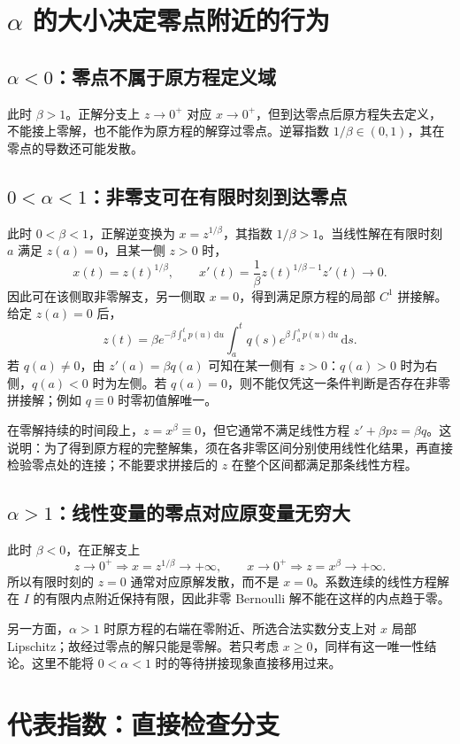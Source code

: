 \documentclass[11pt,a4paper]{ctexart}
\newcommand{\dd}{\,\mathrm d}
\begin{document}
\section{$\alpha$ 的大小决定零点附近的行为}
\subsection{$\alpha<0$：零点不属于原方程定义域}
此时 $\beta>1$。正解分支上 $z\to0^+$ 对应 $x\to0^+$，但到达零点后原方程失去定义，不能接上零解，也不能作为原方程的解穿过零点。逆幂指数 $1/\beta\in(0,1)$，其在零点的导数还可能发散。

\subsection{$0<\alpha<1$：非零支可在有限时刻到达零点}
此时 $0<\beta<1$，正解逆变换为 $x=z^{1/\beta}$，其指数 $1/\beta>1$。当线性解在有限时刻 $a$ 满足 $z(a)=0$，且某一侧 $z>0$ 时，
\[
x(t)=z(t)^{1/\beta},\qquad
x'(t)=\frac1\beta z(t)^{1/\beta-1}z'(t)\longrightarrow0.
\]
因此可在该侧取非零解支，另一侧取 $x=0$，得到满足原方程的局部 $C^1$ 拼接解。给定 $z(a)=0$ 后，
\[
z(t)=\beta e^{-\beta\int_a^t p(u)\dd u}
\int_a^t q(s)e^{\beta\int_a^s p(u)\dd u}\dd s.
\]
若 $q(a)\ne0$，由 $z'(a)=\beta q(a)$ 可知在某一侧有 $z>0$：$q(a)>0$ 时为右侧，$q(a)<0$ 时为左侧。若 $q(a)=0$，则不能仅凭这一条件判断是否存在非零拼接解；例如 $q\equiv0$ 时零初值解唯一。

在零解持续的时间段上，$z=x^\beta\equiv0$，但它通常不满足线性方程 $z'+\beta pz=\beta q$。这说明：为了得到原方程的完整解集，须在各非零区间分别使用线性化结果，再直接检验零点处的连接；不能要求拼接后的 $z$ 在整个区间都满足那条线性方程。

\subsection{$\alpha>1$：线性变量的零点对应原变量无穷大}
此时 $\beta<0$，在正解支上
\[
z\to0^+\Rightarrow x=z^{1/\beta}\to+\infty,
\qquad
x\to0^+\Rightarrow z=x^\beta\to+\infty.
\]
所以有限时刻的 $z=0$ 通常对应原解发散，而不是 $x=0$。系数连续的线性方程解在 $I$ 的有限内点附近保持有限，因此非零 Bernoulli 解不能在这样的内点趋于零。

另一方面，$\alpha>1$ 时原方程的右端在零附近、所选合法实数分支上对 $x$ 局部 Lipschitz；故经过零点的解只能是零解。若只考虑 $x\ge0$，同样有这一唯一性结论。这里不能将 $0<\alpha<1$ 时的等待拼接现象直接移用过来。

\section{代表指数：直接检查分支}
\end{document}

